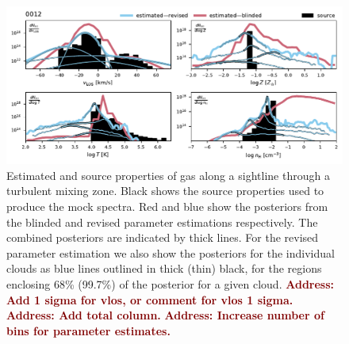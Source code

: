 \documentclass[fleqn,usenatbib]{mnras}
\newcommand{\todo}[1]{\textcolor{Maroon}{\textbf{Address: #1}}}
\begin{document}
\begin{figure}
    \centering
    \includegraphics[width=\textwidth]{figures/sample2/high-z/sightline_0012.pdf}
    \caption{
    Estimated and source properties of gas along a sightline through a turbulent mixing zone.
    Black shows the source properties used to produce the mock spectra.
    Red and blue show the posteriors from the blinded and revised parameter estimations respectively. 
    The combined posteriors are indicated by thick lines.
    For the revised parameter estimation we also show the posteriors for the individual clouds as blue lines outlined in thick (thin) black, for the regions enclosing 68\% (99.7\%) of the posterior for a given cloud.
    \todo{Add 1 sigma for vlos, or comment for vlos 1 sigma.}
    \todo{Add total column.}
    \todo{Increase number of bins for parameter estimates.}
    }
    \label{f: sample2 12}
\end{figure}
\end{document}
